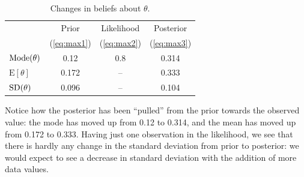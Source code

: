{\begin{figure}[h!]
\end{figure}
\begin{table}[h!]
\bigskip

\begin{tabular}{|l|c|c|c|}
\cline{2-4}
\multicolumn{1}{c|}{~}& Prior & Likelihood & Posterior \\
\multicolumn{1}{c|}{~}& (\ref{eq:max1}) & (\ref{eq:max2}) &(\ref{eq:max3}) \\
\hline
$\textnormal{Mode}(\theta)$ & 0.12 & 0.8 & 0.314 \\
$\text{E}[\theta]$ & 0.172 & -- & 0.333 \\
$\textnormal{SD}(\theta)$ & 0.096 & -- & 0.104 \\
\hline
\end{tabular}
\caption{Changes in beliefs about $\theta$.}


\end{table}

Notice how the posterior has been ``pulled'' from the prior towards the observed value: the mode has moved up from 0.12 to 0.314, and the mean has moved up from 0.172 to 0.333.  Having just one observation in the likelihood, we see that there is hardly any change in the standard deviation from prior to posterior: we would expect to see a decrease in standard deviation with the addition of more data values.}




